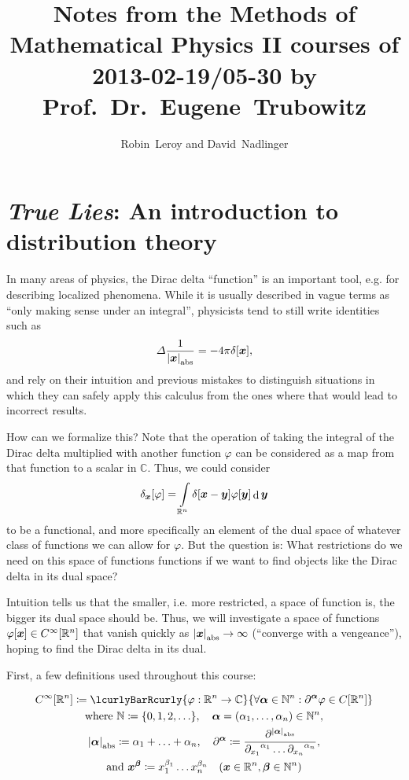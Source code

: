 \documentclass[10pt]{article}
\title{Notes from the Methods of Mathematical Physics II courses of 2013-02-19{\slash}05-30 by Prof.~Dr.~Eugene~Trubowitz}
\author{Robin~Leroy and David~Nadlinger}
\DeclarePairedDelimiter\singleBars{\lvert}{\rvert}
\DeclarePairedDelimiter\parentheses{\lparen}{\rparen}
\DeclarePairedDelimiter\squareBrackets{[}{]}
\DeclareMathOperator{\diffd}{d}
\newcommand{\pd}[2]{{\partial_{#1}}^{#2}}
\newcommand{\N}{\mathbb{N}}
\newcommand{\R}{\mathbb{R}}
\newcommand{\C}{\mathbb{C}}
\newcommand{\Cont}{C}
\newcommand{\Continf}{\Cont^\infty}
\newcommand\of[1]{\parentheses*{#1}}
\newcommand\abs[1]{\singleBars*{#1}}
\newcommand{\setst}[2]{\lcurlyBarRcurly{#1}{#2}}
\newcommand\ga\alpha
\newcommand\gb\beta
\newcommand\gj\varphi
\newcommand{\vx}{{\vectorsym x}}
\newcommand{\vy}{{\vectorsym y}}
\newcommand{\miga}{{\vectorsym \alpha}}
\newcommand{\migb}{{\vectorsym \beta}}
\renewcommand\of[1]{\squareBrackets*{#1}}
\renewcommand\abs[1]{\singleBars*{#1}_{\mathrm{abs}}}
\newcommand\Int[1]{\int\limits_{#1}}
\newcommand{\Rn}{{\R^n}}
\begin{document}
  \maketitle
  \section{\emph{True Lies}: An introduction to distribution theory}
  In many areas of physics, the Dirac delta ``function'' is an important tool, e.g. for describing localized phenomena. While it is usually described in vague terms as ``only making sense under an integral'', physicists tend to still write identities such as
  \begin{equation*}
    \Delta \frac{1}{\abs{\vx}} = -4 \pi \delta\of\vx,
  \end{equation*}
  and rely on their intuition and previous mistakes to distinguish situations in which they can safely apply this calculus from the ones where that would lead to incorrect results.

  How can we formalize this? Note that the operation of taking the integral of the Dirac delta multiplied with another function $\gj$ can be considered as a map from that function to a scalar in $\C$. Thus, we could consider
  \begin{equation*}
    \delta_\vx\of\gj = \Int\Rn \delta\of{\vx - \vy} \gj\of\vy \diffd\vy
  \end{equation*}
  to be a functional, and more specifically an element of the dual space of whatever class of functions we can allow for $\gj$. But the question is: What restrictions do we need on this space of functions functions if we want to find objects like the Dirac delta in its dual space?

  Intuition tells us that the smaller, i.e. more restricted, a space of function is, the bigger its dual space should be. Thus, we will investigate a space of functions $\gj\of\vx \in \Continf\of\Rn$ that vanish quickly as $\abs{\vx} \rightarrow \infty$ (``converge with a vengeance''), hoping to find the Dirac delta in its dual.

  First, a few definitions used throughout this course:

  \begin{gather*}
    \Continf\of\Rn \coloneqq \setst{\gj: \Rn \rightarrow \C}{\forall \miga \in \N^n: \partial^\miga\gj \in \Cont\of\Rn} \\
    \text{where }\N \coloneqq \{0, 1, 2, \ldots\},\quad\miga = (\ga_1, \ldots, \ga_n) \in \N^n, \\
    \abs{\miga} \coloneqq \ga_1 + \ldots + \ga_n,\quad \partial^\miga \coloneqq \frac{\partial^{\abs{\miga}}}{\pd{x_1}{\ga_1} \ldots \pd{x_n}{\ga_n}}, \\
    \text{and }\vx^\migb \coloneqq x_1^{\gb_1} \ldots x_n^{\gb_n}\quad(\vx \in \Rn, \migb \in \N^n)
  \end{gather*}
\end{document}
